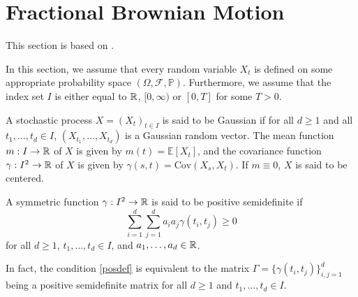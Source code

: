 \section{Fractional Brownian Motion}
This section is based on \cite{fBMbook}.

In this section, we assume that every random variable $X_{t}$ is defined on some appropriate probability space $(\Omega, \mathcal{F},\mathbb{P})$. Furthermore, we assume that the index set $I$ is either equal to $\mathbb{R}$, $[0,\infty)$ or $[0,T]$ for some $T>0$. 
\begin{defn}
    A stochastic process $X=(X_{t})_{t\in I}$ is said to be Gaussian if for all $d\geq 1$ and all $t_{1},\dots,t_{d}\in I$, $(X_{t_{1}},\dots,X_{t_{d}})$ is a Gaussian random vector. The mean function $m: I\to \mathbb{R}$ of $X$ is given by $m(t)=\mathbb{E}[X_{t}]$, and the covariance function $\gamma: I^{2}\to\mathbb{R}$ of $X$ is given by $\gamma(s,t)=\textrm{Cov}(X_{s},X_{t})$. If $m\equiv 0$, $X $ is said to be centered.
\end{defn}

\begin{defn}
    A symmetric function $\gamma: I^{2}\to \mathbb{R}$ is said to be positive semidefinite if
    \begin{equation}\label{posdef}
        \sum_{i=1}^{d}\sum_{j=1}^{d}a_{i}a_{j}\gamma(t_{i},t_{j})\geq 0
    \end{equation}
    for all $d\geq 1$, $t_{1},\dots,t_{d}\in I$, and $a_{1},\dots,a_{d}\in\mathbb{R}$.
\end{defn}
In fact, the condition \eqref{posdef} is equivalent to the matrix $\Gamma=\big\{\gamma (t_{i},t_{j})\big\}_{i,j=1}^{d}$ being a positive semidefinite matrix for all $d\geq 1$ and $t_{1},\dots,t_{d}\in I$.

